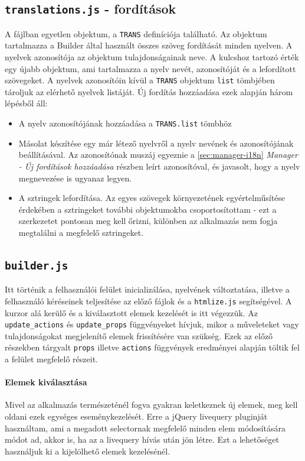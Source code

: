 \documentclass[12pt,a4paper,twoside]{article}
\begin{document}
\subsection{\texttt{translations.js} - fordítások}
\label{sec:builder-i18n}

A fájlban egyetlen objektum, a \texttt{TRANS} definíciója található. Az objektum
tartalmazza a Builder által használt összes szöveg fordítását minden nyelven. A
nyelvek azonosítója az objektum tulajdonságainak neve. A kulcshoz tartozó érték
egy újabb objektum, ami tartalmazza a nyelv nevét, azonosítóját és a lefordított
szövegeket. A nyelvek azonosítóin kívül a \texttt{TRANS} objektum \texttt{list}
tömbjében tároljuk az elérhető nyelvek listáját. Új fordítás hozzáadása ezek
alapján három lépésből áll:

\begin{itemize}
\item A nyelv azonosítójának hozzáadása a \texttt{TRANS.list} tömbhöz
\item Másolat készítése egy már létező nyelvről a nyelv nevének és
  azonosítójának beállításával. Az azonosítónak muszáj egyeznie a
  \ref{sec:manager-i18n} \textit{Manager - Új fordítások hozzáadása} részben leírt
  azonosítóval, és javasolt, hogy a nyelv megnevezése is ugyanaz legyen.
\item A sztringek lefordítása. Az egyes szövegek környezetének egyértelműsítése
  érdekében a sztringeket további objektumokba csoportosítottam - ezt a
  szerkezetet pontosan meg kell őrizni, különben az alkalmazás nem fogja
  megtalálni a megfelelő sztringeket.
\end{itemize}


\subsection{\texttt{builder.js}}
Itt történik a felhasználói felület inicializálása, nyelvének változtatása,
illetve a felhasználó kéréseinek teljesítése az előző fájlok és a
\texttt{htmlize.js} segítségével. A kurzor alá kerülő és a kiválasztott elemek
kezelését is itt végezzük.  Az \texttt{update\_actions} és
\texttt{update\_props} függvényeket hívjuk, mikor a műveleteket vagy
tulajdonságokat megjelenítő elemek frissítésére van szükség. Ezek az előző
részekben tárgyalt \texttt{props} illetve \texttt{actions} függvények eredményei
alapján töltik fel a felület megfelelő részeit.


\paragraph{Elemek kiválasztása}
Mivel az alkalmazás természeténél fogva gyakran keletkeznek új elemek, meg kell
oldani ezek egységes eseménykezelését. Erre a jQuery livequery pluginját
használtam, ami a megadott selectornak megfelelő minden elem módosítására módot
ad, akkor is, ha az a livequery hívás után jön létre. Ezt a lehetőséget
használjuk ki a kijelölhető elemek kezelésénél.
\end{document}
